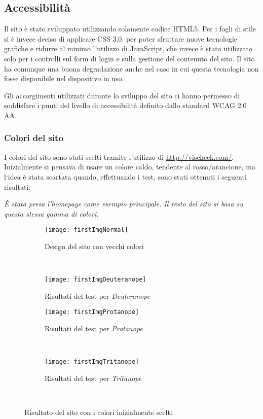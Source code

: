 \graphicspath{ {res/img/} }

\subsection{Accessibilità}
Il sito è stato sviluppato utilizzando solamente codice HTML5. Per i fogli di stile si è invece deciso di applicare CSS 3.0, per poter sfruttare nuove tecnologie grafiche e ridurre al minimo l'utilizzo di JavaScript, che invece è stato utilizzato solo per i controlli sul form di login e sulla gestione del contenuto del sito. Il sito ha comunque una buona degradazione anche nel caso in cui questa tecnologia non fosse disponibile nel dispositivo in uso.

Gli accorgimenti utilizzati durante lo sviluppo del sito ci hanno permesso di soddisfare i punti del livello di accessibilità definito dallo standard WCAG 2.0 AA.

\subsubsection{Colori del sito}
I colori del sito sono stati scelti tramite l'utilizzo di \url{http://vischeck.com/}. Inizialmente si pensava di usare un colore caldo, tendente al rosso/arancione, ma l`idea \`e stata scartata quando, effettuando i test, sono stati ottenuti i seguenti risultati:

\textit{\`E stata presa l'homepage come esempio principale. Il resto del sito si basa su questa stessa gamma di colori.}

\begin{figure}[H]
    \centering
    \begin{subfigure}[b]{0.45\textwidth}
        \texttt{[image: firstImgNormal]}
        \caption{Design del sito con vecchi colori}
    \end{subfigure}
    ~
    \begin{subfigure}[b]{0.45\textwidth}
        \texttt{[image: firstImgDeuteranope]}
        \caption{Risultati del test per \textit{Deuteranope}}
    \end{subfigure}
    \newline
    \begin{subfigure}[b]{0.45\textwidth}
        \texttt{[image: firstImgProtanope]}
        \caption{Risultati del test per \textit{Protanope}}
    \end{subfigure}
    ~
    \begin{subfigure}[b]{0.45\textwidth}
        \texttt{[image: firstImgTritanope]}
        \caption{Risultati del test per \textit{Tritanope}}
    \end{subfigure}
    ~
    \caption{Risultato del sito con i colori inizialmente scelti}
\end{figure}


